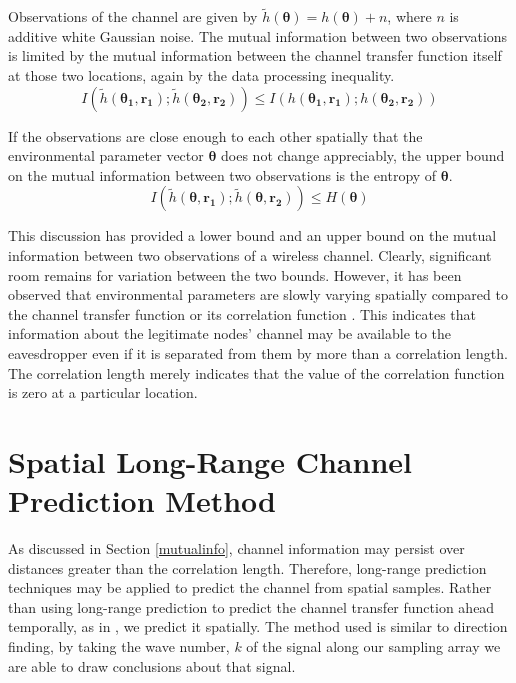 \documentclass{allertonproc}
\begin{document}
Observations of the channel are given by $\tilde{h}(\boldsymbol{\theta})=h(\boldsymbol{\theta})+n$, where $n$ is additive white Gaussian noise.  The mutual information between two observations is limited by the mutual information between the channel transfer function itself at those two locations, again by the data processing inequality.
\begin{equation}
I(\tilde{h}(\boldsymbol{\theta_1},\mathbf{r_1}); \tilde{h}(\boldsymbol{\theta_2},\mathbf{r_2}))\leq I(h(\boldsymbol{\theta_1},\mathbf{r_1}); h(\boldsymbol{\theta_2},\mathbf{r_2}))
\end{equation}

If the observations are close enough to each other spatially that the environmental parameter vector $\boldsymbol{\theta}$ does not change appreciably, the upper bound on the mutual information between two observations is the entropy of $\boldsymbol{\theta}$.
\begin{equation}
I(\tilde{h}(\boldsymbol{\theta},\mathbf{r_1}); \tilde{h}(\boldsymbol{\theta},\mathbf{r_2}))\leq H(\boldsymbol{\theta})
\end{equation}

This discussion has provided a lower bound and an upper bound on the mutual information between two observations of a wireless channel.  Clearly, significant room remains for variation between the two bounds.  However, it has been observed that environmental parameters are slowly varying spatially compared to the channel transfer function or its correlation function \cite{jakes1974, duel-hallen2007}.  This indicates that information about the legitimate nodes' channel may be available to the eavesdropper even if it is separated from them by more than a correlation length.   The correlation length merely indicates that the value of the correlation function is zero at a particular location.  

\section{Spatial Long-Range Channel Prediction Method}\label{prediction}
As discussed in Section \ref{mutualinfo}, channel information may persist over distances greater than the correlation length. Therefore, long-range prediction techniques may be applied to predict the channel from spatial samples. Rather than using long-range prediction to predict the channel transfer function ahead temporally, as in \cite{duel-hallen2007}, we predict it spatially. The method used is similar to direction finding, by taking the wave number, $k$ of the signal along our sampling array we are able to draw conclusions about that signal. 
\end{document}

